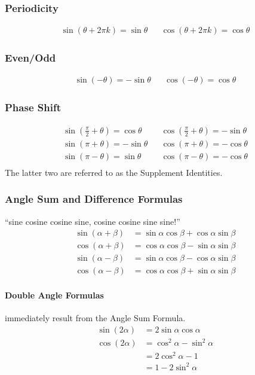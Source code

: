 \documentclass{article}
\begin{document}
\subsubsection{Periodicity}
\begin{align*}
    \sin{\left(\theta+2\pi k\right)} = \sin{\theta} &&
    \cos{\left(\theta+2\pi k\right)} = \cos{\theta}
\end{align*}
\subsubsection{Even/Odd}
\begin{align*}
    \sin{\left(-\theta\right)} = -\sin{\theta}&&
    \cos{\left(-\theta\right)} = \cos{\theta}
\end{align*}
\subsubsection{Phase Shift}
\begin{align*}
    \sin{\left(\frac{\pi}{2} + \theta\right)} = \cos{\theta} &&
    \cos{\left(\frac{\pi}{2} + \theta\right)} = -\sin{\theta}\\
    \sin{\left(\pi + \theta\right)} = -\sin{\theta} &&
    \cos{\left(\pi + \theta\right)} = -\cos{\theta}\\
    \sin{\left(\pi - \theta\right)} = \sin{\theta} &&
    \cos{\left(\pi - \theta\right)} = -\cos{\theta}\\
\end{align*}
The latter two are referred to as the Supplement Identities.

\subsubsection{Angle Sum and Difference Formulas} ``sine cosine cosine sine, cosine cosine sine sine!''
\begin{align*}
    \sin{\left(\alpha+\beta\right)} &= \sin{\alpha}\cos{\beta}+\cos{\alpha}\sin{\beta}\\
    \cos{\left(\alpha+\beta\right)} &= \cos{\alpha}\cos{\beta}-\sin{\alpha}\sin{\beta}\\
    \sin{\left(\alpha-\beta\right)} &= \sin{\alpha}\cos{\beta}-\cos{\alpha}\sin{\beta}\\
    \cos{\left(\alpha-\beta\right)} &= \cos{\alpha}\cos{\beta}+\sin{\alpha}\sin{\beta}
\end{align*}
\paragraph{Double Angle Formulas} immediately result from the Angle Sum Formula.
\begin{align*}
    \sin{\left(2\alpha\right)} &= 2\sin{\alpha}\cos{\alpha}\\
    \cos{\left(2\alpha\right)} &= \cos^2{\alpha}-\sin^2{\alpha}\\
                                &= 2\cos^2{\alpha}-1\\
                                &= 1-2\sin^2{\alpha}
\end{align*}
\end{document}

